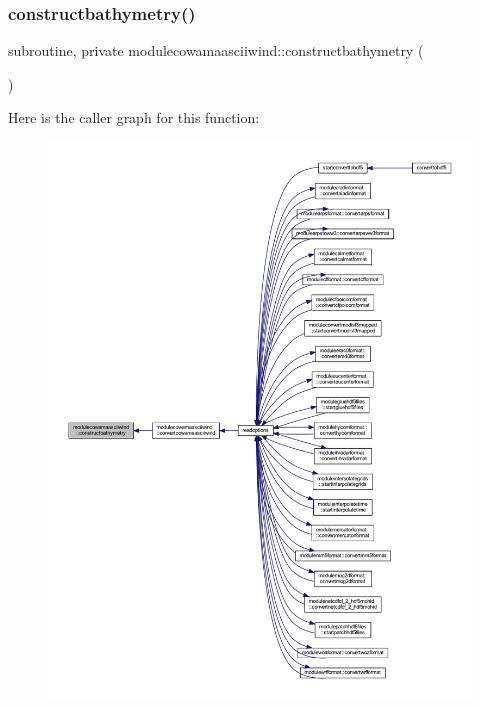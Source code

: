 \subsubsection{\texorpdfstring{constructbathymetry()}{constructbathymetry()}}
{\footnotesize\ttfamily subroutine, private modulecowamaasciiwind\+::constructbathymetry (\begin{DoxyParamCaption}{ }\end{DoxyParamCaption})\hspace{0.3cm}{\ttfamily [private]}}

Here is the caller graph for this function\+:\nopagebreak
\begin{figure}[H]
\begin{center}
\leavevmode
\includegraphics[width=350pt]{namespacemodulecowamaasciiwind_a1fde1515d3a9c4b1b2737393842f1f39_icgraph}
\end{center}
\end{figure}
\mbox{\label{namespacemodulecowamaasciiwind_a52864e15417a95bd07a7bac59fc24b28}} 
